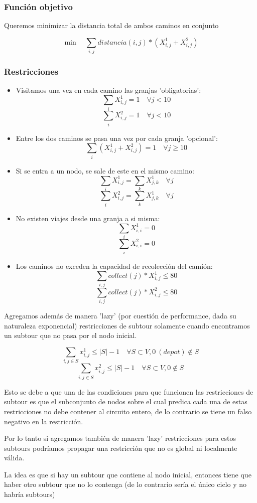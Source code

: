 \subsubsection{Función objetivo}
Queremos minimizar la distancia total de ambos caminos en conjunto

$$\min \quad \sum_{i,j} distancia(i,j)*(X^1_{i,j} + X^2_{i,j}) $$
\subsubsection{Restricciones}

\begin{itemize}
    \item Visitamos una vez en cada camino las granjas 'obligatorias':
    $$ \sum_{i} X^1_{i,j} = 1 \quad \forall j < 10 $$
    $$ \sum_{i} X^2_{i,j} = 1 \quad \forall j < 10 $$

    \item Entre los dos caminos se pasa una vez por cada granja 'opcional':
    $$ \sum_{i} (X^1_{i,j} + X^2_{i,j}) = 1 \quad \forall j \geq 10 $$

    \item Si se entra a un nodo, se sale de este en el mismo camino:
    $$ \sum_{i} X^1_{i,j} = \sum_{k} X^1_{j,k}  \quad \forall j $$
    $$ \sum_{i} X^2_{i,j} = \sum_{k} X^1_{j,k}  \quad \forall j $$

    \item No existen viajes desde una granja a si misma:
    $$ \sum_{i} X^1_{i,i} = 0 $$
    $$ \sum_{i} X^2_{i,i} = 0 $$

    \item Los caminos no exceden la capacidad de recolección del camión:
    $$ \sum_{i,j} collect(j)*X^1_{i,j} \leq 80 $$
    $$ \sum_{i,j} collect(j)*X^2_{i,j} \leq 80 $$

\end{itemize}

Agregamos además de manera 'lazy' (por cuestión de performance, dada su naturaleza exponencial) restricciones de subtour solamente cuando encontramos un subtour que no pasa por el nodo inicial.

$$ \sum_{i,j \in S} x^1_{i,j} \leq |S|-1 \quad \forall S \subset V, 0\ (depot) \not \in S $$
$$ \sum_{i,j \in S} x^2_{i,j} \leq |S|-1 \quad \forall S \subset V, 0 \not \in S $$


Esto se debe a que una de las condiciones para que funcionen las restricciones de subtour es que el subconjunto de nodos sobre el cual predica cada una de estas restricciones no debe contener al circuito entero, de lo contrario se tiene un falso negativo en la restricción.

Por lo tanto si agregamos también de manera 'lazy' restricciones para estos subtours podríamos propagar una restricción que no es global ni localmente válida.

La idea es que si hay un subtour que contiene al nodo inicial, entonces tiene que haber otro subtour que no lo contenga (de lo contrario sería el único ciclo y no habría subtours)
